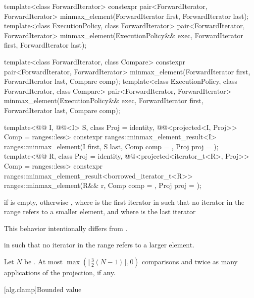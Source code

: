 %
\begin{itemdecl}
template<class ForwardIterator>
  constexpr pair<ForwardIterator, ForwardIterator>
    minmax_element(ForwardIterator first, ForwardIterator last);
template<class ExecutionPolicy, class ForwardIterator>
  pair<ForwardIterator, ForwardIterator>
    minmax_element(ExecutionPolicy&& exec,
                   ForwardIterator first, ForwardIterator last);

template<class ForwardIterator, class Compare>
  constexpr pair<ForwardIterator, ForwardIterator>
    minmax_element(ForwardIterator first, ForwardIterator last, Compare comp);
template<class ExecutionPolicy, class ForwardIterator, class Compare>
  pair<ForwardIterator, ForwardIterator>
    minmax_element(ExecutionPolicy&& exec,
                   ForwardIterator first, ForwardIterator last, Compare comp);

template<@@ I, @@<I> S, class Proj = identity,
         @@<projected<I, Proj>> Comp = ranges::less>
  constexpr ranges::minmax_element_result<I>
    ranges::minmax_element(I first, S last, Comp comp = {}, Proj proj = {});
template<@@ R, class Proj = identity,
         @@<projected<iterator_t<R>, Proj>> Comp = ranges::less>
  constexpr ranges::minmax_element_result<borrowed_iterator_t<R>>
    ranges::minmax_element(R&& r, Comp comp = {}, Proj proj = {});
\end{itemdecl}


\begin{itemdescr}
\pnum
\returns
{} if  is empty, otherwise
, where  is
the first iterator in  such that no iterator in the range refers
to a smaller element, and where  is the last iterator
\begin{footnote}
This behavior
intentionally differs from .
\end{footnote}
in  such that no iterator in the range refers to a larger element.

\pnum
\complexity
Let $N$ be .
At most $\max(\bigl\lfloor{\frac{3}{2}} (N-1)\bigr\rfloor, 0)$ comparisons and
twice as many applications of the projection, if any.
\end{itemdescr}

[alg.clamp]{Bounded value}

